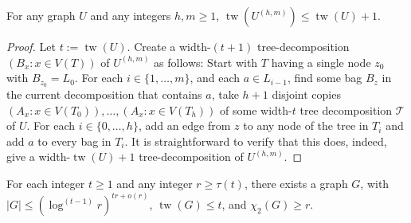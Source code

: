 \documentclass[kpfonts]{patmorin}
\DeclareMathOperator{\tw}{tw}
\newcommand{\trn}{\chi_2}
\theoremstyle{named}
\begin{document}
\begin{lem}\label{boost-treewidth}
    For any graph $U$ and any integers $h,m\ge 1$, $\tw(U^{(h,m)})\le \tw(U)+1$.
\end{lem}

\begin{proof}
  Let $t:=\tw(U)$.
  Create a width-$(t+1)$ tree-decomposition $(B_x:x\in V(T))$ of $U^{(h,m)}$ as follows: Start with $T$ having a single node $z_0$ with $B_{z_0}=L_0$.  For each $i\in\{1,\ldots,m\}$, and each $a\in L_{i-1}$, find some bag $B_z$ in the current decomposition that contains $a$, take $h+1$ disjoint copies $(A_x:x\in V(T_0)),\ldots,(A_x:x\in V(T_h))$ of some width-$t$ tree decomposition $\mathcal{T}$ of $U$.  For each $i\in\{0,\ldots,h\}$, add an edge from $z$ to any node of the tree in $T_i$ and add $a$ to every bag in $T_i$.  It is straightforward to verify that this does, indeed, give a width-$\tw(U)+1$ tree-decomposition of $U^{(h,m)}$.
\end{proof}


\begin{lem}\label{treewidth-lower-bound}
    For each integer $t\ge 1$ and any integer $r\ge \tau(t)$, there exists a graph $G$, with $|G|\le (\log^{(t-1)}r)^{tr + o(r)}$, $\tw(G)\le t$, and $\trn(G)\ge r$.
\end{lem}
\end{document}

